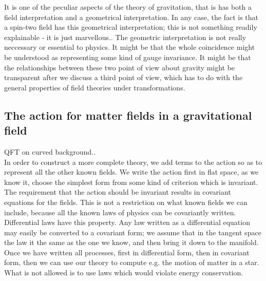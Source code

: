 It is one of the peculiar aspects of the theory of gravitation, that is has both a field interpretation and a geometrical interpretation. In any case, the fact is that a spin-two field has this geometrical interpretation; this is not something readily explainable - it is just marvellous.. The geometric interpretation is not really neccessary or essential to physics. It might be that the whole coincidence might be understood as representing some kind of gauge invariance. It might be that the relationships between these two point of view about gravity might be transparent after we discuss a third point of view, which has to do with the general properties of field theories under transformations.
\subsection{The action for matter fields in a gravitational field}
QFT on curved background..\\
In order to construct a more complete theory, we add terms to the action so as to represent all the other known fields. We write the action first in flat space, as we know it, choose the simplest form from some kind of criterion which is invariant. The requirement that the action should be invariant results in covariant equations for the fields. This is not a restriction on what known fields we can include, because all the known laws of physics can be covariantly written. Differential laws have this property. Any law written as a differential equation may easily be converted to a covariant form; we assume that in the tangent space the law it the same as the one we know, and then bring it down to the manifold. Once we have written all processes, first in differential form, then in covariant form, then we can use our theory to compute e.g. the motion of matter in a star. What is not allowed is to use laws which would violate energy conservation.
